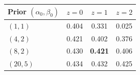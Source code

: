 \begin{tabular}{l ccc}
\toprule
Prior $(\alpha_0,\beta_0)$ & $z=0$ & $z=1$ & $z=2$ \\
\midrule
$(1,1)$ & 0.404 & 0.331 & 0.025 \\
$(4,2)$ & 0.421 & 0.402 & 0.376 \\
$(8,2)$ & 0.430 & \textbf{0.421} & 0.406 \\
$(20,5)$ & 0.434 & 0.432 & 0.425 \\
\bottomrule
\end{tabular}
